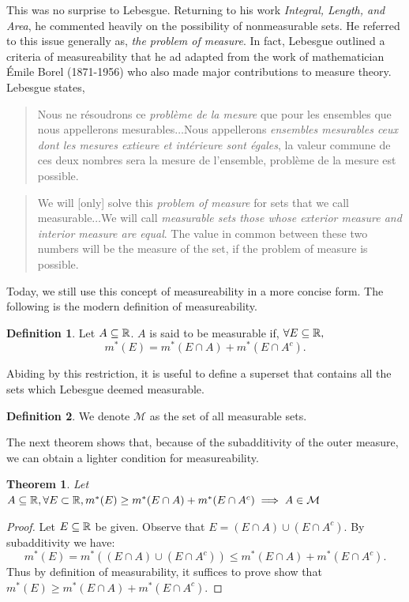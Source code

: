 \documentclass{article}
\newtheorem{theorem}{Theorem}
\theoremstyle{axiom} \newtheorem{axiom}{Axiom}
\theoremstyle{definition} \newtheorem{definition}{Definition}
\theoremstyle{example} \newtheorem{example}{Example}
\theoremstyle{proposition} \newtheorem{prop}{Proposition}
\theoremstyle{lemma} \newtheorem{lemma}{Lemma}
\newcommand{\sM}{\mathcal{M}}  \newcommand{\sN}{\mathcal{N}}
\begin{document}
This was no surprise to Lebesgue. Returning to his work \textit{Integral, Length,
and Area}\cite{lebesgue:1902}, he commented heavily on the possibility of nonmeasurable sets. He 
referred to this issue generally as, \textit{the problem of measure}. In fact, 
Lebesgue outlined a criteria of measureability that he ad adapted from the
work of mathematician Émile Borel (1871-1956) who also made major contributions
to measure theory. Lebesgue states,
\begin{multicols}{2}
\begin{quote}
	Nous ne résoudrons ce \textit{problème de la mesure} que pour les ensembles
	que nous appellerons mesurables$\ldots$Nous appellerons \textit{ensembles 
	mesurables ceux dont les mesures extieure et intérieure sont égales}, la
	valeur commune de ces deux nombres sera la mesure de l'ensemble, problème 
	de la mesure est possible. 
\end{quote}
\begin{quote}
	We will [only] solve this \textit{problem of measure} for sets that we call
	measurable$\ldots$We will call \textit{measurable sets those whose
	exterior measure and interior measure are equal}. The value in common between
	these two numbers will be the measure of the set, if the problem of measure is 
	possible. 
\end{quote}
\end{multicols}
Today, we still use this concept of measureability in a more concise form. The
following is the modern definition of measureability.
\begin{definition}
	Let $A \subseteq \mathbb{R}$. $A$ is said to be measurable if, $\forall E\subseteq \mathbb{R},$
	\begin{equation}
		m^*(E) = m^*(E\cap A)+m^*(E\cap A^c).
	\end{equation}
\end{definition}

Abiding by this restriction, it is useful to define a superset that contains all
the sets which Lebesgue deemed measurable.
\begin{definition}
	We denote $\sM$ as the set of all measurable sets. 
\end{definition}
The next theorem shows that, because of the subadditivity of the outer measure,
we can obtain a lighter condition for measureability.  
\begin{theorem}
	Let $A\subseteq \R, \forall E \subset \R, m^*(E) \geq m^*(E\cap A) + m^*(E\cap A^c) \implies A \in\sM$ 
\end{theorem}
\begin{proof}
	Let $E \subseteq \mathbb{R}$ be given. Observe that $E = (E\cap A) \cup (E\cap A^c)$. 
	By subadditivity we have:
	\begin{equation*} 
		m^*(E) = m^*((E\cap A) \cup (E\cap A^c)) \leq  m^*(E\cap A) + m^*(E\cap A^c).
	\end{equation*}
	Thus by definition of measurability, it suffices to prove show that 
	$m^*(E) \geq m^*(E\cap A) + m^*(E\cap A^c)$.
\end{proof}
\end{document}
